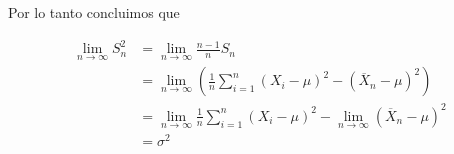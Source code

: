 \documentclass[letterpaper]{article}
\newcommand{\limninf}{\lim_{n\to\infty}}
\newcommand{\pars}[1]{\left( #1 \right) }
\newcommand{\1}{\mathbbm{1}}
\begin{document}
\begin{enumerate}
		Por lo tanto concluimos que

		\begin{align*}
			\limninf S_n^2 &= \limninf \frac{n-1}{n}S_n\\
			&= \limninf\pars{\frac{1}{n}\sum_{i=1}^n\pars{X_i-\mu}^2 - \pars{\overline{X}_n - \mu}^2}\\
			&= \limninf \frac{1}{n}\sum_{i=1}^n\pars{X_i-\mu}^2 - \limninf \pars{\overline{X}_n - \mu}^2\\
			&= \sigma^2
		\end{align*}

    \end{enumerate}

	
\end{document}
